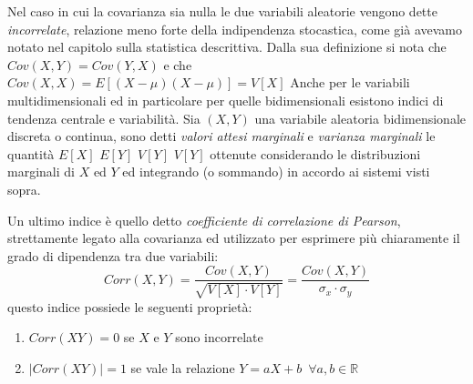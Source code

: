 \documentclass[a4paper,12pt, oneside]{book}
\newcommand{\numberset}{\mathbb}
\newcommand{\R}{\numberset{R}}
\begin{document}
Nel caso in cui la covarianza sia nulla le due variabili aleatorie vengono dette \emph{incorrelate}, relazione meno 
forte della indipendenza stocastica, come già avevamo notato nel capitolo sulla statistica descrittiva.\newline
Dalla sua definizione si nota che $Cov(X, Y) = Cov(Y, X)$ e che $Cov(X, X) = E[(X - \mu)(X - \mu)] = V[X]$
Anche per le variabili multidimensionali ed in particolare per quelle bidimensionali 
esistono indici di tendenza centrale e variabilità.\newline
Sia $(X, Y)$ una variabile aleatoria bidimensionale discreta o continua, sono detti \emph{valori attesi marginali} 
e \emph{varianza marginali }le quantità $E[X]\,\,E[Y]\,\,V[Y]\,\,V[Y]$
ottenute considerando le distribuzioni marginali di $X$ ed $Y $ ed integrando (o sommando) in accordo ai sistemi visti sopra.

Un ultimo indice è quello detto \emph{coefficiente di correlazione di Pearson}, strettamente legato 
alla covarianza ed utilizzato per esprimere più chiaramente il grado di dipendenza tra due variabili:
\[Corr(X, Y) = \frac{Cov(X,Y)}{\sqrt{V[X]\cdot V[Y]}} = \frac{Cov(X,Y)}{\sigma_x\cdot \sigma_y}\]
questo indice possiede le seguenti proprietà:
\begin{enumerate}
    \item $Corr(XY) = 0$ se $X$ e $Y$ sono incorrelate
    \item $|Corr(XY)| = 1$ se vale la relazione $Y= aX + b\,\,\,\forall a,b \in \R$
\end{enumerate}
\end{document}

